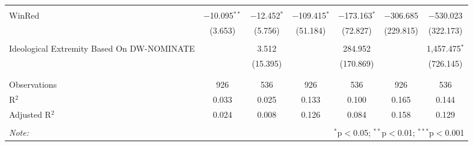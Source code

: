 \begin{tabular}{@{\extracolsep{5pt}}lcccccc}
  & & & & & & \\ 
 WinRed & $-$10.095$^{**}$ & $-$12.452$^{*}$ & $-$109.415$^{*}$ & $-$173.163$^{*}$ & $-$306.685 & $-$530.023 \\ 
  & (3.653) & (5.756) & (51.184) & (72.827) & (229.815) & (322.173) \\ 
  & & & & & & \\ 
 Ideological Extremity Based On DW-NOMINATE &  & 3.512 &  & 284.952 &  & 1,457.475$^{*}$ \\ 
  &  & (15.395) &  & (170.869) &  & (726.145) \\ 
  & & & & & & \\ 
\hline \\[-1.8ex] 
Observations & 926 & 536 & 926 & 536 & 926 & 536 \\ 
R$^{2}$ & 0.033 & 0.025 & 0.133 & 0.100 & 0.165 & 0.144 \\ 
Adjusted R$^{2}$ & 0.024 & 0.008 & 0.126 & 0.084 & 0.158 & 0.129 \\ 
\hline 
\hline \\[-1.8ex] 
\textit{Note:}  & \multicolumn{6}{r}{$^{*}$p$<$0.05; $^{**}$p$<$0.01; $^{***}$p$<$0.001} \\ 
\end{tabular} 
